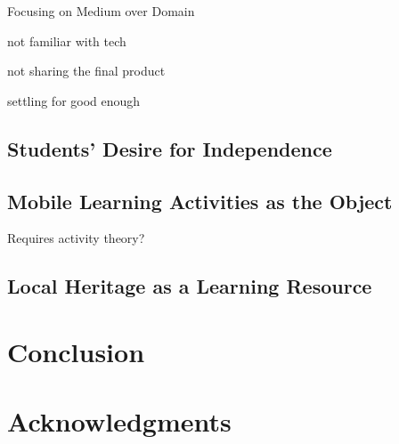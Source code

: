 \documentclass[,hyphens]{sigchi}
\begin{document}
Focusing on Medium over Domain

not familiar with tech

not sharing the final product

settling for good enough

\subsection{Students' Desire for Independence}


\subsection{Mobile Learning Activities as the Object}
Requires activity theory?

\subsection{Local Heritage as a Learning Resource}


\section{Conclusion}

\section{Acknowledgments}

\balance{}



\end{document}
